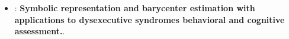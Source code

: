 \begin{itemize}

    

    

    \item \textbf{}:  \textbf{Symbolic representation and barycenter estimation with applications to dysexecutive syndromes behavioral and cognitive assessment.}.     
    
    

\end{itemize}



